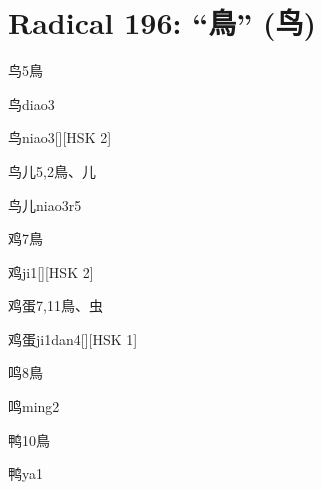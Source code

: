 
\section*{Radical 196: ``⿃'' (鸟)}

\begin{entry}{鸟}{5}{⿃}
  \begin{phonetics}{鸟}{diao3}
  \end{phonetics}
  \begin{phonetics}{鸟}{niao3}[][HSK 2]
  \end{phonetics}
\end{entry}

\begin{entry}{鸟儿}{5,2}{⿃、⼉}
  \begin{phonetics}{鸟儿}{niao3r5}
  \end{phonetics}
\end{entry}

\begin{entry}{鸡}{7}{⿃}
  \begin{phonetics}{鸡}{ji1}[][HSK 2]
  \end{phonetics}
\end{entry}

\begin{entry}{鸡蛋}{7,11}{⿃、⾍}
  \begin{phonetics}{鸡蛋}{ji1dan4}[][HSK 1]
  \end{phonetics}
\end{entry}

\begin{entry}{鸣}{8}{⿃}
  \begin{phonetics}{鸣}{ming2}
  \end{phonetics}
\end{entry}

\begin{entry}{鸭}{10}{⿃}
  \begin{phonetics}{鸭}{ya1}
  \end{phonetics}
\end{entry}

